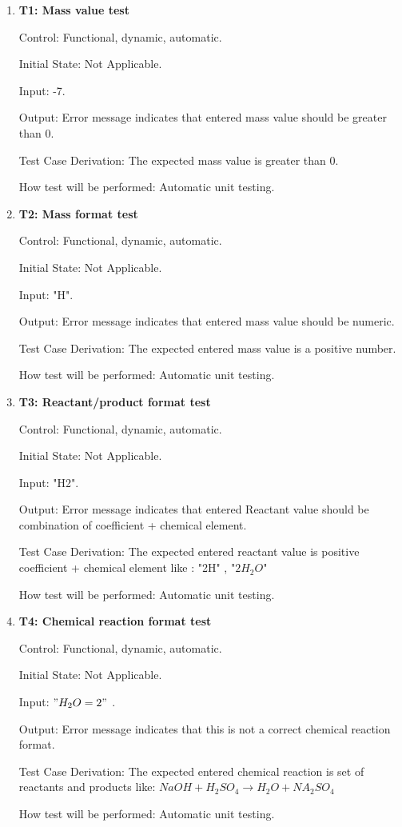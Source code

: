 \documentclass[12pt, titlepage]{article}
\begin{document}
\begin{enumerate}

\item{\bf T1: Mass value test\\}

Control:  Functional, dynamic, automatic.
					
Initial State: Not Applicable.
					
Input:  -7.
					
Output: Error message indicates that entered mass value should be greater than 0.

Test Case Derivation: The expected mass value is greater than 0. 
					
How test will be performed: Automatic unit testing. 

\item{\bf T2: Mass format test\\}

Control:  Functional, dynamic, automatic.
					
Initial State: Not Applicable.
					
Input:  "H".
					
Output: Error message indicates that entered mass value should be numeric.

Test Case Derivation: The expected entered mass value is a positive number.
					
How test will be performed: Automatic unit testing.

\item{\bf T3: Reactant/product format test\\}

Control:  Functional, dynamic, automatic.
					
Initial State: Not Applicable.
					
Input:  "H2".
					
Output: Error message indicates that entered Reactant value should be combination of coefficient + chemical element.

Test Case Derivation: The expected entered reactant value is positive coefficient + chemical element like : "2H" , "$2H_2O$"
					
How test will be performed: Automatic unit testing.


\item{\bf T4: Chemical reaction format test\\}

Control:  Functional, dynamic, automatic.
					
Initial State: Not Applicable.
					
Input: $"H_2O = 2"$ .
					
Output: Error message indicates that this is not a correct chemical reaction format. 

Test Case Derivation: The expected entered chemical reaction is set of reactants and products like: $NaOH + H_2SO_4 \rightarrow H_2O + NA_2SO_4$
					
How test will be performed: Automatic unit testing.
 
\end{enumerate}
\end{document}
